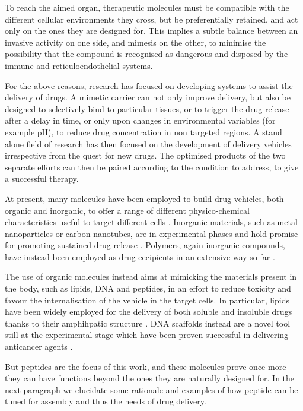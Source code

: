 To reach the aimed organ, therapeutic molecules must be compatible with the different cellular environments they cross, but be preferentially retained, and act only on the ones they are designed for. This implies a subtle balance between an invasive activity on one side, and mimesis on the other, to minimise the possibility that the compound is recognised as dangerous and disposed by the immune and reticuloendothelial systems.

For the above reasons, research has focused on developing systems to assist the delivery of drugs. A mimetic carrier can not only improve delivery, but also be designed to selectively bind to particular tissues, or to trigger the drug release after a delay in time, or only upon changes in environmental variables (for example pH), to reduce drug concentration in non targeted regions. A stand alone field of research has then focused on the development of delivery vehicles irrespective from the quest for new drugs. The optimised products of the two separate efforts can then be paired according to the condition to address, to give a successful therapy.

At present, many molecules have been employed to build drug vehicles, both organic and inorganic, to offer a range of different physico-chemical characteristics useful to target different cells \citep{Hughes2005}. Inorganic materials, such as metal nanoparticles or carbon nanotubes, are in experimental phases and hold promise for promoting sustained drug release \citep{Boisselier2009,Depan2011}. Polymers, again inorganic compounds, have  instead been employed as drug eccipients in an extensive way so far \citep{Lammers2009,Liechty2010,Nicolas2013}.

The use of organic molecules instead aims at mimicking the materials present in the body, such as lipids, DNA and peptides, in an effort to reduce toxicity and favour the internalisation of the vehicle in the target cells. In particular, lipids have been widely employed for the delivery of both soluble and insoluble drugs thanks to their amphihpatic structure \citep{Pattni2015paper,Jain2017,Yingchoncharoen2016,Bunker2016}. DNA scaffolds instead are a novel tool still at the experimental stage which have been proven successful in delivering anticancer agents \citep{Zhang2014, Jiang2012}. 

But peptides are the focus of this work, and these molecules prove once more they can have functions beyond the ones they are naturally designed for. In the next paragraph we elucidate some rationale and examples of how peptide can be tuned for assembly and thus the needs of drug delivery.

